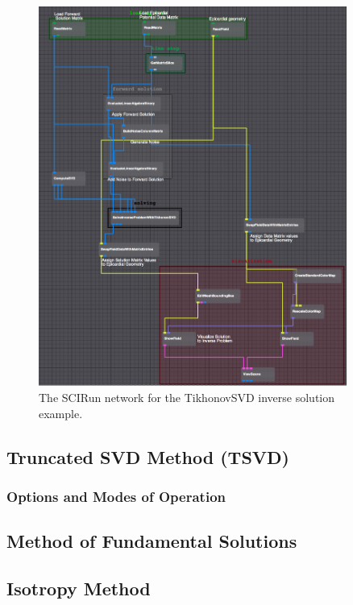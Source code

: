     
    \begin{figure}
        \begin{center}
        \includegraphics[width=0.9\textwidth]{ECGToolkitGuide_figures/TikhonovSVDNetwork.png}
        \caption{The SCIRun network for the TikhonovSVD inverse solution example.}
        \label{fig:TikhonovNetworkExampleSVD}
        \end{center}
    \end{figure}
    
\subsection{Truncated SVD Method (TSVD)}
    
    \subsubsection{Options and Modes of Operation}

\subsection{Method of Fundamental Solutions}

\subsection{Isotropy Method}

